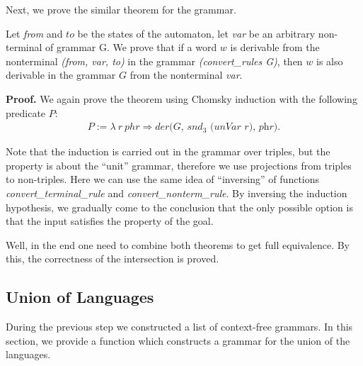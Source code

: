 Next, we prove the similar theorem for the grammar.

\begin{theorem}
	Let \textit{from} and $to$ be the states of the automaton, let \textit{var} be an arbitrary non-terminal of grammar G. We prove that if a word $w$ is derivable from the nonterminal \textit{(from, var, to)} in the grammar \textit{(convert\_rules G)}, then $w$ is also derivable in the grammar $G$ from the nonterminal \textit{var}.
\end{theorem}

\textbf{Proof.} 
We again prove the theorem using Chomsky induction with the following predicate $P$:
\begin{align*}
P :=  \lambda \ r \ phr \Rightarrow \textit{der(G, $snd_3$ (unVar r), phr)}.
\end{align*}

Note that the induction is carried out in the grammar over triples, but the property is about the ``unit'' grammar, therefore we use projections from triples to non-triples.
Here we can use the same idea of ``inversing'' of functions \textit{convert\_terminal\_rule} and \textit{convert\_nonterm\_rule}.
By inversing the induction hypothesis, we gradually come to the conclusion that the only possible option is that the input satisfies the property of the goal. 

 


Well, in the end one need to combine both theorems to get full equivalence. By this, the correctness of the intersection is proved.

\subsection{Union of Languages}

During the previous step we constructed a list of context-free grammars. In this section, we provide a function which constructs a grammar for the union of the languages.

